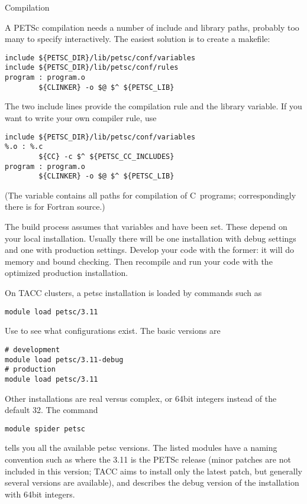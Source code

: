  {Compilation}

A PETSc compilation needs a number of include and library paths,
probably too many to specify interactively. The easiest solution is to
create a makefile:
\begin{verbatim}
include ${PETSC_DIR}/lib/petsc/conf/variables
include ${PETSC_DIR}/lib/petsc/conf/rules
program : program.o
        ${CLINKER} -o $@ $^ ${PETSC_LIB}
\end{verbatim}
The two include lines provide the compilation rule and the library
variable. If you want to write your own compiler rule, use
\begin{verbatim}
include ${PETSC_DIR}/lib/petsc/conf/variables
%.o : %.c
        ${CC} -c $^ ${PETSC_CC_INCLUDES}
program : program.o
        ${CLINKER} -o $@ $^ ${PETSC_LIB}
\end{verbatim}
(The  variable contains all paths for
compilation of C~programs; correspondingly there is
 for Fortran source.)

The build process assumes that variables  and
 have been set. These depend on your local
installation. Usually there will be one installation with debug
settings and one with production settings. Develop your code with the
former: it will do memory and bound checking. Then recompile and run
your code with the optimized production installation.

\begin{taccnote}
  On TACC clusters, a petsc installation is loaded by commands such as
\begin{verbatim}
module load petsc/3.11
\end{verbatim}
Use  to see what configurations exist. The basic
versions are
\begin{verbatim}
# development
module load petsc/3.11-debug
# production
module load petsc/3.11
\end{verbatim}
Other installations are real versus complex, or 64bit integers instead
of the default 32. The command 
\begin{verbatim}
module spider petsc
\end{verbatim}
tells you all the
available petsc versions. The listed modules have a naming convention
such as  where the 3.11 is the PETSc release (minor
patches are not included in this version; TACC aims to install only
the latest patch, but generally several versions are available), and
 describes the debug version of the installation with 64bit
integers.
\end{taccnote}

